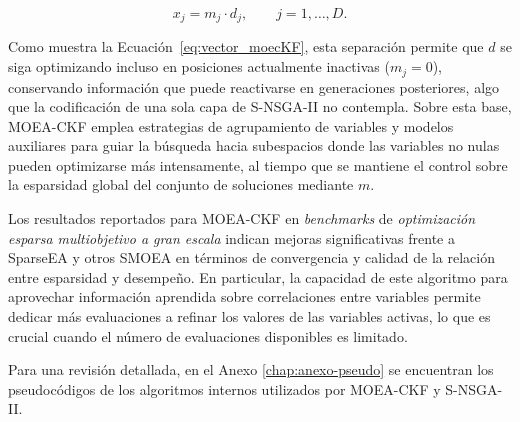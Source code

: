 \begin{equation}
x_j = m_j \cdot d_j, \qquad j = 1,\ldots,D.
\label{eq:vector_moecKF}
\end{equation}

Como muestra la Ecuación~\ref{eq:vector_moecKF}, esta separación permite que $d$ se siga optimizando incluso en posiciones actualmente inactivas ($m_j = 0$), conservando información que puede reactivarse en generaciones posteriores, algo que la codificación de una sola capa de S-NSGA-II no contempla. Sobre esta base, MOEA-CKF emplea estrategias de agrupamiento de variables y modelos auxiliares para guiar la búsqueda hacia subespacios donde las variables no nulas pueden optimizarse más intensamente, al tiempo que se mantiene el control sobre la esparsidad global del conjunto de soluciones mediante $m$.

Los resultados reportados para MOEA-CKF en \textit{benchmarks} de \textit{optimización esparsa multiobjetivo a gran escala} indican mejoras significativas frente a SparseEA y otros SMOEA en términos de convergencia y calidad de la relación entre esparsidad y desempeño. En particular, la capacidad de este algoritmo para aprovechar información aprendida sobre correlaciones entre variables permite dedicar más evaluaciones a refinar los valores de las variables activas, lo que es crucial cuando el número de evaluaciones disponibles es limitado.


Para una revisión detallada, en el Anexo \ref{chap:anexo-pseudo} se encuentran los pseudocódigos de los algoritmos internos utilizados por MOEA-CKF y S-NSGA-II.


